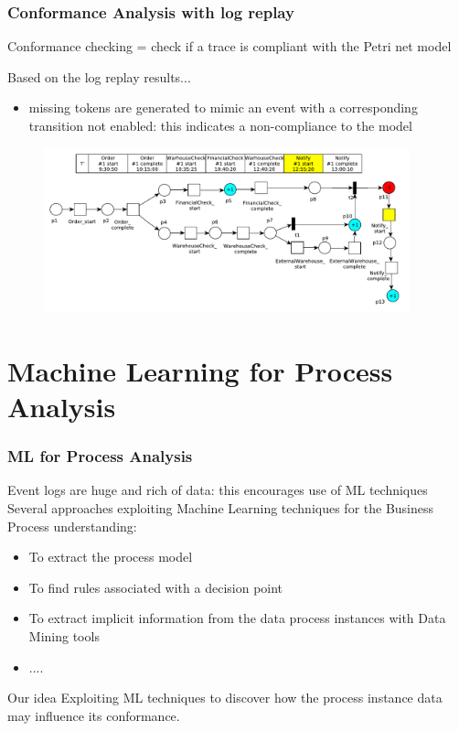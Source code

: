 \documentclass[10pt]{beamer}
\begin{document}
\begin{frame}
\frametitle{Conformance Analysis with log replay}
\begin{block}{}
	Conformance checking = check if a trace is compliant with the Petri net model
	\end{block}
	\smallskip
	\smallskip
	\begin{block}{Based on the log replay results...}
		\begin{itemize}
			\item \alert{missing tokens} are generated to mimic an event with a corresponding transition not enabled: this indicates a non-compliance to the model
		\end{itemize}
	\end{block}
\smallskip
\smallskip
\begin{figure}
\includegraphics[width=300pt]{./item/conformanceAnalysis.pdf}
\end{figure}
\end{frame}


\section{Machine Learning for Process Analysis}

\begin{frame}
\frametitle{ML for Process Analysis}
\begin{block}{}
Event logs are huge and rich of data: this encourages use of ML techniques\\
\smallskip
Several approaches exploiting Machine Learning techniques for the Business Process understanding:
\begin{itemize}
\item To extract the process model
\item To find rules associated with a decision point
\item To extract implicit information from the data process instances with Data Mining tools
\item ....
\end{itemize} 
\end{block}

\smallskip
\smallskip
\smallskip
\smallskip
\begin{block}{{Our idea}}
Exploiting ML techniques to discover how the {\color{red} process instance data} may influence its {\color{red} conformance}.\\
\end{block}
\end{frame}
\end{document}
